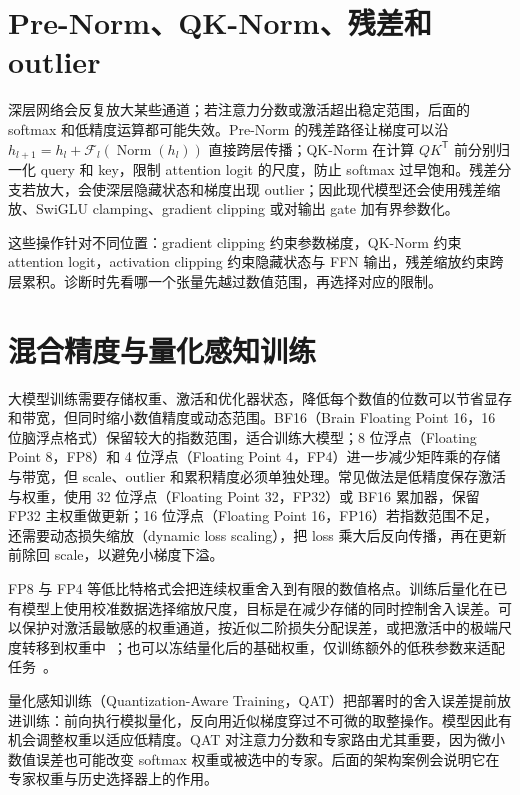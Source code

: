 \section{Pre-Norm、QK-Norm、残差和 outlier}
\label{sec:qk-norm}

深层网络会反复放大某些通道；若注意力分数或激活超出稳定范围，后面的 softmax 和低精度运算都可能失效。Pre-Norm 的残差路径让梯度可以沿 \(h_{l+1}=h_l+\mathcal F_l(\operatorname{Norm}(h_l))\) 直接跨层传播；QK-Norm 在计算 \(QK^\mathsf T\) 前分别归一化 query 和 key，限制 attention logit 的尺度，防止 softmax 过早饱和。残差分支若放大，会使深层隐藏状态和梯度出现 outlier；因此现代模型还会使用残差缩放、SwiGLU clamping、gradient clipping 或对输出 gate 加有界参数化。

这些操作针对不同位置：gradient clipping 约束参数梯度，QK-Norm 约束 attention logit，activation clipping 约束隐藏状态与 FFN 输出，残差缩放约束跨层累积。诊断时先看哪一个张量先越过数值范围，再选择对应的限制。

\section{混合精度与量化感知训练}

大模型训练需要存储权重、激活和优化器状态，降低每个数值的位数可以节省显存和带宽，但同时缩小数值精度或动态范围。BF16（Brain Floating Point 16，16 位脑浮点格式）保留较大的指数范围，适合训练大模型；8 位浮点（Floating Point 8，FP8）和 4 位浮点（Floating Point 4，FP4）进一步减少矩阵乘的存储与带宽，但 scale、outlier 和累积精度必须单独处理。常见做法是低精度保存激活与权重，使用 32 位浮点（Floating Point 32，FP32）或 BF16 累加器，保留 FP32 主权重做更新；16 位浮点（Floating Point 16，FP16）若指数范围不足，还需要动态损失缩放（dynamic loss scaling），把 loss 乘大后反向传播，再在更新前除回 scale，以避免小梯度下溢。

FP8 与 FP4 等低比特格式会把连续权重舍入到有限的数值格点。训练后量化在已有模型上使用校准数据选择缩放尺度，目标是在减少存储的同时控制舍入误差。可以保护对激活最敏感的权重通道，按近似二阶损失分配误差，或把激活中的极端尺度转移到权重中~\cite{lin2024awq,frantar2023gptq,xiao2023smoothquant}；也可以冻结量化后的基础权重，仅训练额外的低秩参数来适配任务~\cite{dettmers2023qlora}。

量化感知训练（Quantization-Aware Training，QAT）把部署时的舍入误差提前放进训练：前向执行模拟量化，反向用近似梯度穿过不可微的取整操作。模型因此有机会调整权重以适应低精度。QAT 对注意力分数和专家路由尤其重要，因为微小数值误差也可能改变 softmax 权重或被选中的专家。后面的架构案例会说明它在专家权重与历史选择器上的作用。

